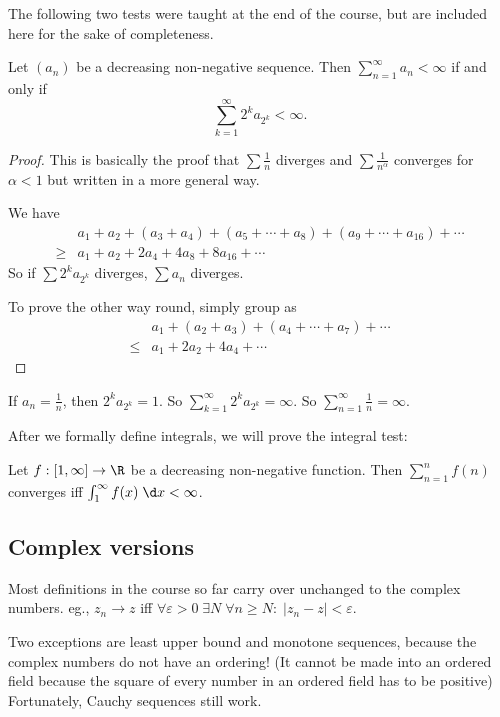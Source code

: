\documentclass[a4paper]{article}
\begin{document}
The following two tests were taught at the end of the course, but are included here for the sake of completeness.
\begin{thm}
  Let $(a_n)$ be a decreasing non-negative sequence. Then $\sum_{n = 1}^\infty a_n < \infty$ if and only if
  \[
    \sum_{k = 1}^\infty 2^k a_{2^k} < \infty.
  \]
\end{thm}

\begin{proof}
  This is basically the proof that $\sum \frac{1}{n}$ diverges and $\sum \frac{1}{n^{\alpha}}$ converges for $\alpha < 1$ but written in a more general way.

  We have
  \begin{align*}
    &a_1 + a_2 + (a_3 + a_4) + (a_5 + \cdots + a_8) + (a_9 + \cdots + a_{16}) + \cdots\\
    \geq & a_1 + a_2 + 2a_4 + 4a_8 + 8 a_{16} + \cdots
  \end{align*}
  So if $\sum 2^k a_{2^k}$ diverges, $\sum a_n$ diverges.

  To prove the other way round, simply group as
  \begin{align*}
    & a_1 + (a_2 + a_3) + (a_4 + \cdots + a_7) + \cdots\\
    \leq & a_1 + 2a_2 + 4a_4 + \cdots
  \end{align*}
\end{proof}

\begin{eg}
  If $a_n = \frac{1}{n}$, then $2^k a_{2^k} = 1$. So $\sum_{k = 1}^\infty 2^k a_{2^k} = \infty$. So $\sum_{n = 1}^\infty \frac{1}{n} = \infty$.
\end{eg}

After we formally define integrals, we will prove the integral test:
\begin{thm}
  Let $f: [1, \infty] \to \R$ be a decreasing non-negative function. Then $\sum_{n = 1}^n f(n)$ converges iff $\int_1^\infty f(x)\;\d x < \infty$.
\end{thm}

\subsection{Complex versions}
Most definitions in the course so far carry over unchanged to the complex numbers. eg., $z_n \to z$ iff $\forall \varepsilon > 0\;\exists N\;\forall n\geq N:\; |z_n - z| < \varepsilon$.

Two exceptions are least upper bound and monotone sequences, because the complex numbers do not have an ordering! (It cannot be made into an ordered field because the square of every number in an ordered field has to be positive) Fortunately, Cauchy sequences still work.
\end{document}
